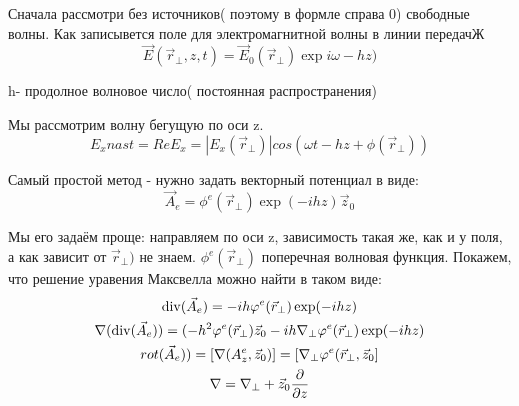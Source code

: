 Сначала рассмотри без источников( поэтому в формле справа 0) свободные волны.
Как записывется поле для электромагнитной волны в линии передачЖ
\begin{equation}
	\vec{E}(\vec{r}_\perp , z , t) = \vec{E}_0(\vec{r}_\perp) \exp{i\omega - h z)}
\end{equation}

 h- продолное волновое число( постоянная распространения)

 Мы рассмотрим волну бегущую по оси z.
 \begin{equation}
 	E_{x}{nast} = Re{E_x}= |E_x(\vec{r}_\perp)| cos(\omega t - hz + \phi(\vec{r}_\perp))
 \end{equation}

 Самый простой метод - нужно задать векторный потенциал в виде:
 \begin{equation}
 	\vec{A}_e = \phi^e(\vec{r}_\perp) \exp(-i h z) \vec{z}_0
 \end{equation}

Мы его задаём проще: направляем по оси z, зависимость такая же, как и у поля, а как зависит от $\vec{r}_\perp)$  не знаем.
	$\phi^e(\vec{r}_\perp)$	поперечная волновая функция.
Покажем, что решение уравения Максвелла можно найти в таком виде:
\begin{gather}
	\operatorname{div}(\vec{A}_e)= -i h \varphi^e(\vec{r}_\perp) \exp(-i h z)\\
	\nabla(\operatorname{div}(\vec{A}_e)) = (- h^2 \varphi^e(\vec{r}_\perp) \vec{z}_0 - i h \nabla_\perp \varphi^e(\vec{r}_\perp ) \exp(-i h z)\\
	rot(\vec{A}_e)) = [\nabla(A^e_z,\vec{z}_0 )] = [\nabla_\perp \varphi^e(\vec{r}_\perp, \vec{z}_0 ]\\
	\nabla = \nabla_\perp + \vec{z}_0 \pdv{z}\\
\end{gather} 


